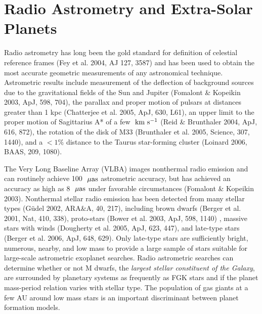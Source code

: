 \documentclass[12pt,preprint]{aastex}
\begin{document}
\section{Radio Astrometry and Extra-Solar Planets}

Radio astrometry has long been the gold standard for definition of 
celestial reference frames (Fey et al. 2004, AJ 127, 3587) and has been 
used to obtain the most accurate geometric measurements of any 
astronomical technique.  Astrometric results include measurement of 
the deflection of background sources due to the gravitational
fields of the Sun and Jupiter (Fomalont \& Kopeikin 2003, ApJ, 598, 704), 
the parallax and proper motion of pulsars at distances greater than 
1 kpc (Chatterjee et al. 2005, ApJ, 630, L61), an upper limit
to the proper motion of Sagittarius A* of a few ${\rm\ km\ s^{-1}}$
(Reid \& Brunthaler 2004, ApJ, 616, 872), the rotation of the disk 
of M33 (Brunthaler et al. 2005, Science, 307, 1440), and
a $<1\%$ distance to the Taurus star-forming
cluster (Loinard 2006, BAAS, 209, 1080).

The Very Long Baseline Array (VLBA) images nonthermal radio emission
and can routinely achieve 100 ${\rm\ \mu as}$ astrometric accuracy, but has
achieved an accuracy as high as 8 ${\rm\ \mu as}$ under favorable
circumstances (Fomalont \& Kopeikin 2003).
Nonthermal stellar radio emission has been detected from many stellar
types (G\"udel 2002, ARA\&A, 40, 217), including brown dwarfs 
(Berger et al. 2001, Nat, 410, 338),
proto-stars (Bower et al. 2003, ApJ, 598, 1140) , massive
stars with winds (Dougherty et al. 2005, ApJ, 623, 447), 
and late-type stars 
(Berger et al. 2006, ApJ, 648, 629).
Only late-type
stars are sufficiently bright, numerous, nearby, and low mass to
provide a large sample of stars suitable for large-scale astrometric
exoplanet searches.  Radio astrometric searches can determine whether
or not M dwarfs, the {\em largest stellar constituent of the Galaxy}, are
surrounded by planetary systems as frequently as FGK stars and if the
planet mass-period relation varies with stellar type.  The population
of gas giants at a few AU around low mass stars is an important
discriminant between planet formation models.
\end{document}
